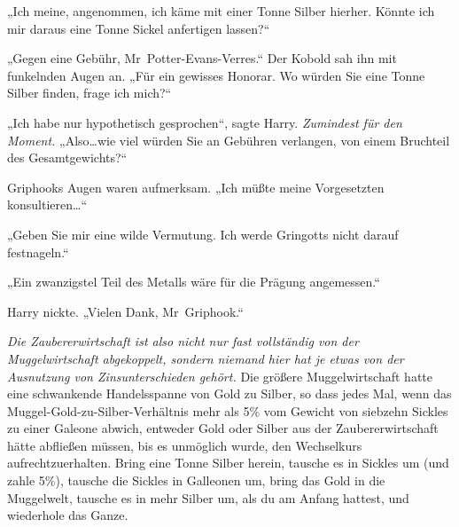 „Ich meine, angenommen, ich käme mit einer Tonne Silber hierher. Könnte ich mir daraus eine Tonne Sickel anfertigen lassen?“

„Gegen eine Gebühr, Mr~Potter-Evans-Verres.“ Der Kobold sah ihn mit funkelnden Augen an. „Für ein gewisses Honorar. Wo würden Sie eine Tonne Silber finden, frage ich mich?“

„Ich habe nur hypothetisch gesprochen“, sagte Harry. \emph{Zumindest für den Moment.} „Also…wie viel würden Sie an Gebühren verlangen, von einem Bruchteil des Gesamtgewichts?“

Griphooks Augen waren aufmerksam. „Ich müßte meine Vorgesetzten konsultieren…“

„Geben Sie mir eine wilde Vermutung. Ich werde Gringotts nicht darauf festnageln.“

„Ein zwanzigstel Teil des Metalls wäre für die Prägung angemessen.“

Harry nickte. „Vielen Dank, Mr~Griphook.“

\emph{Die Zaubererwirtschaft ist also nicht nur fast vollständig von der Muggelwirtschaft abgekoppelt, sondern niemand hier hat je etwas von der Ausnutzung von Zinsunterschieden gehört.} Die größere Muggelwirtschaft hatte eine schwankende Handelsspanne von Gold zu Silber, so dass jedes Mal, wenn das Muggel-Gold-zu-Silber-Verhältnis mehr als 5\% vom Gewicht von siebzehn Sickles zu einer Galeone abwich, entweder Gold oder Silber aus der Zaubererwirtschaft hätte abfließen müssen, bis es unmöglich wurde, den Wechselkurs aufrechtzuerhalten. Bring eine Tonne Silber herein, tausche es in Sickles um (und zahle 5\%), tausche die Sickles in Galleonen um, bring das Gold in die Muggelwelt, tausche es in mehr Silber um, als du am Anfang hattest, und wiederhole das Ganze.

